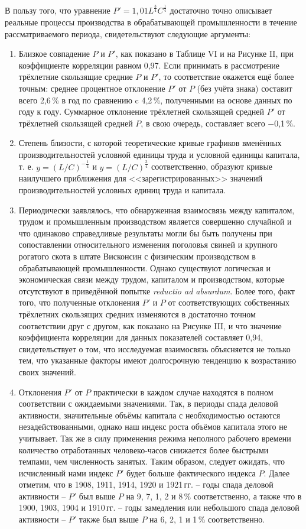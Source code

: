 \documentclass[leqno]{article}  %
\begin{document}
В пользу того, что уравнение \(P'=1,01L^{\frac34}C^{\frac14}\) достаточно точно описывает реальные процессы производства в обрабатывающей промышленности в течение рассматриваемого периода, свидетельствуют следующие аргументы:
\begin{enumerate}[{(1)}]
\item Близкое совпадение \(P\) и \(P'\), как показано в Таблице VI и на Рисунке II, при коэффициенте корреляции равном 0,97. Если принимать в рассмотрение трёхлетние скользящие средние \(P\) и \(P'\), то соответствие окажется ещё более точным: среднее процентное отклонение \(P'\) от \(P\) (без учёта знака) составит всего 2,6\,\% в год по сравнению c 4,2\,\%, полученными на основе данных по году к году. Суммарное отклонение трёхлетней скользящей средней \(P'\) от трёхлетней скользящей средней \(P\), в свою очередь, составляет всего \(-\)0,1\,\%.
\par
\item Степень близости, с которой теоретические кривые графиков вменённых производительностей условной единицы труда и условной единицы капитала, т. е. \(y=(L/C)^{-\frac14}\) и \(y=(L/C)^{\frac34}\) соответственно, образуют кривые наилучшего приближения для <<зарегистрированных>> значений производительностей условных единиц труда и капитала.
\par
\item Периодически заявлялось, что обнаруженная взаимосвязь между капиталом, трудом и промышленным производством является совершенно случайной и что одинаково справедливые результаты могли бы быть получены при сопоставлении относительного изменения поголовья свиней и крупного рогатого скота в штате Висконсин с физическим производством в обрабатывающей промышленности. Однако существуют логическая и экономическая связи между трудом, капиталом и производством, которые отсутствуют в приведённой попытке \emph{reductio ad absurdum}. Более того, факт того, что полученные отклонения \(P'\) и \(P\) от соответствующих собственных трёхлетних скользящих средних изменяются в достаточно точном соответствии друг с другом, как показано на Рисунке III, и что значение коэффициента корреляции для данных показателей составляет 0,94, свидетельствует о том, что исследуемая взаимосвязь объясняется не только тем, что указанные факторы имеют долгосрочную тенденцию к возрастанию своих значений.
\par
\item Отклонения \(P'\) от \(P\) практически в каждом случае находятся в полном соответствии с ожидаемыми значениями. Так, в периоды спада деловой активности, значительные объёмы капитала с необходимостью остаются незадействованными, однако наш индекс роста объёмов капитала этого не учитывает. Так же в силу применения режима неполного рабочего времени количество отработанных человеко-часов снижается более быстрыми темпами, чем численность занятых. Таким образом, следует ожидать, что исчисленный нами индекс \(P'\) будет больше фактического индекса \(P\). Далее отметим, что в 1908, 1911, 1914, 1920 и 1921\,гг. -- годы спада деловой активности -- \(P'\) был выше \(P\) на 9, 7, 1, 2 и 8\,\% соответственно, а также что в 1900, 1903, 1904 и 1910\,гг. -- годы замедления или небольшого спада деловой активности -- \(P'\) также был выше \(P\) на 6, 2, 1 и 1\,\% соответственно.

\end{enumerate}
\end{document}
